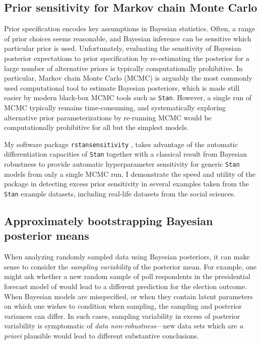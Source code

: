 \subsection{Prior sensitivity for Markov chain Monte Carlo}
%
Prior specification encodes key assumptions in Bayesian statistics.  Often, a
range of prior choices seems reasonable, and Bayesian inference can be sensitive
which particular prior is used.  Unfortunately, evaluating the sensitivity of
Bayesian posterior expectations to prior specification by re-estimating the
posterior for a large number of alternative priors is typically computationally
prohibitive. In particular, Markov chain Monte Carlo (MCMC) is arguably the most
commonly used computational tool to estimate Bayesian posteriors, which is made
still easier by modern black-box MCMC tools such as \texttt{Stan}. However, a
single run of MCMC typically remains time-consuming, and systematically
exploring alternative prior parameterizations by re-running MCMC would be
computationally prohibitive for all but the simplest models.


My software package \texttt{rstansensitivity}
\citep{giordano:2020:rstansensitivity, giordano:2018:mcmchyper}, takes advantage
of the automatic differentiation capacities of \texttt{Stan} together with a
classical result from  Bayesian robustness \citep{gustafson:1996:localposterior,
giordano:2018:covariances} to provide automatic hyperparameter sensitivity for
generic \texttt{Stan} models from only a single MCMC run.  I demonstrate the
speed and utility of the package in detecting excess prior sensitivity in
several examples taken from the \texttt{Stan} example datasets,
including real-life datasets from the social sciences.


\subsection{Approximately bootstrapping Bayesian posterior means}
%
When analyzing randomly sampled data using Bayesian posteriors, it can make
sense to consider the \emph{sampling variability} of the posterior mean.  For
example, one might ask whether a new random sample of poll respondents in the
presidential forecast model of \citet{economist:2020:election} would lead to a
different prediction for the election outcome.  When Bayesian models are
misspecified, or when they contain latent parameters on which one wishes to
condition when sampling, the sampling and posterior variances can differ.  In
such cases, sampling variability in excess of posterior variability is
symptomatic of \emph{data non-robustness}---new data sets which are \textit{a
priori} plausible would lead to different substantive conclusions.

